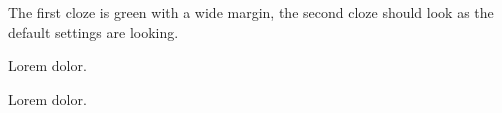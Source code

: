 \documentclass{article}
\begin{document}
{The first cloze is green with a wide margin, the second cloze should
look as the default settings are looking.}

Lorem  dolor.

\clozereset

Lorem  dolor.
\end{document}
